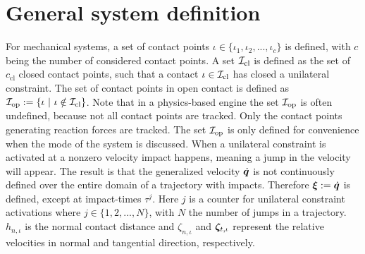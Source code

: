 \documentclass[../DC2017114Bouma.tex]{subfiles}
\begin{document}
\section{General system definition}
For mechanical systems, a set of contact points $\iota\in\{\iota_1,\iota_2,...,\iota_c\}$ is defined, with $c$ being the number of considered contact points. A set $\mathcal{I}_{\text{cl}}$ is defined as the set of $c_{\text{cl}}$ closed contact points, such that a contact $\iota\in\mathcal{I}_{\text{cl}}$ has closed a unilateral constraint. The set of contact points in open contact is defined as $\Ic_{\text{op}} := \{\iota\ |\ \iota\notin\Ic_{\text{cl}}\}$. Note that in a physics-based engine the set $\mathcal{I}_{\text{op}}$ is often undefined, because not all contact points are tracked. Only the contact points generating reaction forces are tracked. The set $\mathcal{I}_{\text{op}}$ is only defined for convenience when the mode of the system is discussed. When a unilateral constraint is activated at a nonzero velocity impact happens, meaning a jump in the velocity will appear. The result is that the generalized velocity $\dot{{\boldsymbol{q}}}$ is not continuously defined over the entire domain of a trajectory with impacts. Therefore $\boldsymbol{\xi}:=\dot{{\boldsymbol{q}}}$ is defined, except at impact-times $\tau^j$. Here $j$ is a counter for unilateral constraint activations where $j\in \{1,2,...,N\}$, with $N$ the number of jumps in a trajectory. $h_{n,\iota}$ is the normal contact distance and $\zeta_{n,\iota}$ and $\boldsymbol{\zeta}_{t,\iota}$ represent the relative velocities in normal and tangential direction,  respectively. 
\end{document}
